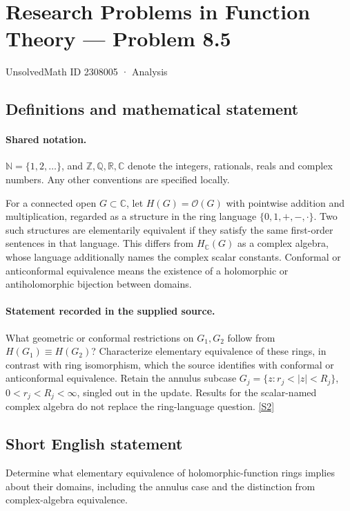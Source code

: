 \documentclass[11pt]{article}
\newcommand{\sref}[2]{\hyperlink{source:#1:#2}{[S#2]}}
\begin{document}
\setcounter{section}{2308004}
\section{Research Problems in Function Theory — Problem 8.5}\label{2308005}
{\small\sffamily UnsolvedMath ID 2308005 · Analysis}
\subsection{Definitions and mathematical statement}

\paragraph{Shared notation.}$\mathbb N=\{1,2,\ldots\}$, and $\mathbb Z,\mathbb Q,\mathbb R,\mathbb C$ denote the integers, rationals, reals and complex numbers. Any other conventions are specified locally.


For a connected open $G\subset\mathbb C$, let $H(G)=\mathcal O(G)$ with pointwise addition and multiplication, regarded as a structure in the ring language $\{0,1,+,-,\cdot\}$. Two such structures are elementarily equivalent if they satisfy the same first-order sentences in that language. This differs from $H_{\mathbb C}(G)$ as a complex algebra, whose language additionally names the complex scalar constants. Conformal or anticonformal equivalence means the existence of a holomorphic or antiholomorphic bijection between domains.
\paragraph{Statement recorded in the supplied source.}
What geometric or conformal restrictions on $G_1,G_2$ follow from $H(G_1)\equiv H(G_2)$? Characterize elementary equivalence of these rings, in contrast with ring isomorphism, which the source identifies with conformal or anticonformal equivalence. Retain the annulus subcase $G_j=\{z:r_j<|z|<R_j\}$, $0<r_j<R_j<\infty$, singled out in the update. Results for the scalar-named complex algebra do not replace the ring-language question. \sref{2308005}{2}
\subsection{Short English statement}
Determine what elementary equivalence of holomorphic-function rings implies about their domains, including the annulus case and the distinction from complex-algebra equivalence.
\end{document}

